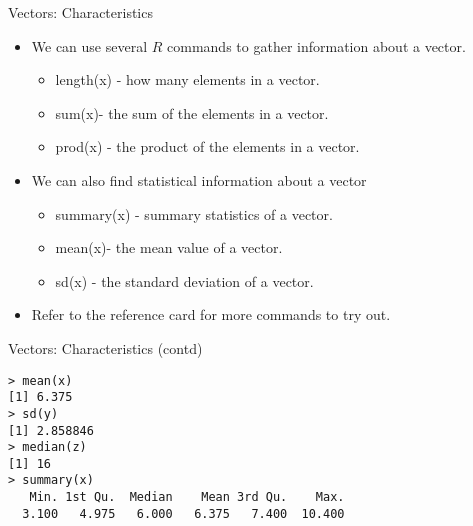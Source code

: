 \documentclass{beamer}
\begin{document}
\begin{frame}[fragile]{Vectors: Characteristics}

\begin{itemize}
\item We can use several $R$ commands to gather information about
a vector.

\begin{itemize}
\item length(x) - how many elements in a vector.  \item sum(x)-
the sum of the elements in a vector. \item prod(x) - the product
of the elements in a vector.
\end{itemize}

\item We can also find statistical information about a vector
\begin{itemize}
\item summary(x) - summary statistics of a vector.  \item mean(x)-
the mean value of a vector. \item sd(x) -  the standard deviation
of a vector.
\end{itemize}

\item Refer to the reference card for more commands to try out.
\end{itemize}
\end{frame}
\begin{frame}[fragile]{Vectors: Characteristics (contd)}

\begin{verbatim}
> mean(x)
[1] 6.375
> sd(y)
[1] 2.858846
> median(z)
[1] 16
> summary(x)
   Min. 1st Qu.  Median    Mean 3rd Qu.    Max.
  3.100   4.975   6.000   6.375   7.400  10.400
\end{verbatim}
\end{frame}
\end{document}
